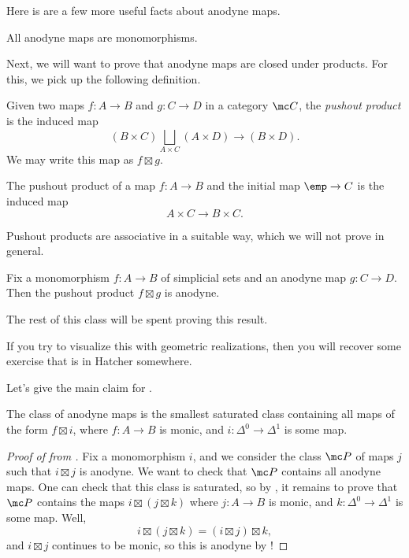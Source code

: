 \documentclass[../notes.tex]{subfiles}
\begin{document}
Here is are a few more useful facts about anodyne maps.
\begin{remark}
	All anodyne maps are monomorphisms.
\end{remark}
Next, we will want to prove that anodyne maps are closed under products. For this, we pick up the following definition.
\begin{definition}
	Given two maps $f\colon A\to B$ and $g\colon C\to D$ in a category $\mc C$, the \textit{pushout product} is the induced map
	\[(B\times C)\bigsqcup_{A\times C}(A\times D)\to (B\times D).\]
	We may write this map as $f\boxtimes g$.
\end{definition}
\begin{example}
	The pushout product of a map $f\colon A\to B$ and the initial map $\emp\to C$ is the induced map
	\[A\times C\to B\times C.\]
\end{example}
\begin{remark}
	Pushout products are associative in a suitable way, which we will not prove in general.
\end{remark}
\begin{theorem} \label{thm:anodyne-pushout-product}
	Fix a monomorphism $f\colon A\to B$ of simplicial sets and an anodyne map $g\colon C\to D$. Then the pushout product $f\boxtimes g$ is anodyne.
\end{theorem}
The rest of this class will be spent proving this result.
\begin{remark}
	If you try to visualize this with geometric realizations, then you will recover some exercise that is in Hatcher somewhere.
\end{remark}
Let's give the main claim for .
\begin{lemma} \label{lem:weird-anodyne}
	The class of anodyne maps is the smallest saturated class containing all maps of the form $f\boxtimes i$, where $f\colon A\to B$ is monic, and $i\colon\Delta^0\to\Delta^1$ is some map.
\end{lemma}
\begin{proof}[Proof of  from ]
	Fix a monomorphism $i$, and we consider the class $\mc P$ of maps $j$ such that $i\boxtimes j$ is anodyne. We want to check that $\mc P$ contains all anodyne maps. One can check that this class is saturated, so by , it remains to prove that $\mc P$ contains the maps $i\boxtimes(j\boxtimes k)$ where $j\colon A\to B$ is monic, and $k\colon\Delta^0\to\Delta^1$ is some map. Well,
	\[i\boxtimes(j\boxtimes k)=(i\boxtimes j)\boxtimes k,\]
	and $i\boxtimes j$ continues to be monic, so this is anodyne by !
\end{proof}
\end{document}
